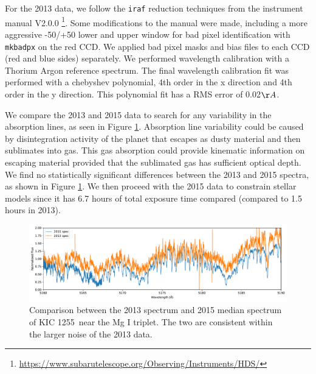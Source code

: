 \documentclass[preprint]{aastex61}
\newcommand{\shStar}{KIC 1255}
\begin{document}
For the 2013 data, we follow the \texttt{iraf} reduction techniques from the instrument manual V2.0.0  \footnote{\url{https://www.subarutelescope.org/Observing/Instruments/HDS/}}.
Some modifications to the manual were made, including a more aggressive -50/+50 lower and upper window for bad pixel identification with \texttt{mkbadpx} on the red CCD.
We applied bad pixel masks and bias files to each CCD (red and blue sides) separately.
We performed wavelength calibration with a Thorium Argon reference spectrum.
The final wavelength calibration fit was performed with a chebyshev polynomial, 4th order in the x direction and 4th order in the y direction.
This polynomial fit has a RMS error of 0.02$\AA$.

We compare the 2013 and 2015 data to search for any variability in the absorption lines, as seen in Figure \ref{fig:spec2013vs2015}.
Absorption line variability could be caused by disintegration activity of the planet that escapes as dusty material and then sublimates into gas.
This gas absorption could provide kinematic information on escaping material provided that the sublimated gas has sufficient optical depth.
We find no statistically significant differences between the 2013 and 2015 spectra, as shown in Figure \ref{fig:spec2013vs2015}.
We then proceed with the 2015 data to constrain stellar models since it has 6.7 hours of total exposure time compared (compared to 1.5 hours in 2013).

\begin{figure}[!hbtp]
\begin{centering}
\includegraphics[width=1.0\textwidth]{images/subaru/2013_vs_2015/2013_vs_2015_spec.pdf}
\caption{Comparison between the 2013 spectrum and 2015 median spectrum of \shStar\ near the Mg I triplet. The two are consistent within the larger noise of the 2013 data.}\label{fig:spec2013vs2015}
\end{centering}
\end{figure}
\end{document}
